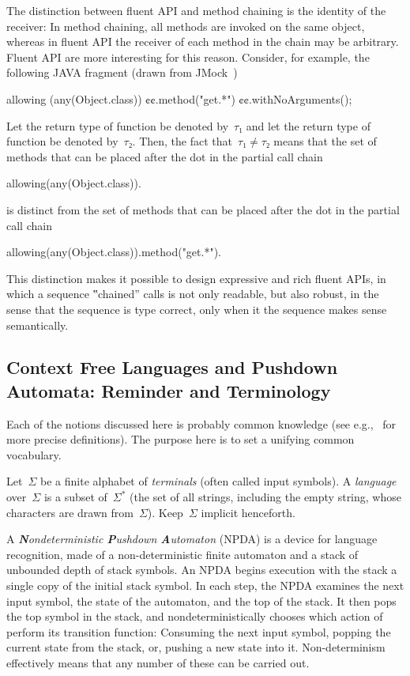 The distinction between fluent API and method chaining is the identity of the receiver:
In method chaining, all methods are invoked on the same object, whereas in fluent API
  the receiver of each method in the chain may be arbitrary.
Fluent API are more interesting for this reason.
Consider, for example, the following JAVA fragment (drawn from JMock~\cite{Freeman:Pryce:06})
\begin{JAVA}
allowing (any(Object.class))
  ¢¢.method("get.*")
  ¢¢.withNoArguments();
\end{JAVA}
Let the return type of function  be denoted by~$τ₁$ and let the
  return type of function  be denoted by~$τ₂$.
Then, the fact that~$τ₁≠τ₂$ means that the set of methods that can be placed after the dot
  in the partial call chain
\begin{JAVA}
allowing(any(Object.class)).
\end{JAVA}
is distinct from the set of methods that can be placed after the dot in the partial call chain
\begin{JAVA}
allowing(any(Object.class)).method("get.*").
\end{JAVA}
This distinction makes it possible to design expressive and rich fluent APIs, in which a
  sequence ‟chained” calls is not only readable, but also robust, in the sense that the
  sequence is type correct, only when it the sequence makes sense semantically.

\subsection{Context Free Languages and Pushdown Automata: Reminder and Terminology}
Each of the notions discussed here is probably common knowledge
 (see e.g.,~\cite{Hopcroft:book:2001,Linz:2001} for more precise definitions).
The purpose here is to set a unifying common vocabulary.

Let~$Σ$ be a finite alphabet of \emph{terminals} (often called input symbols).
A \emph{language} over~$Σ$
  is a subset of~$Σ^*$ (the set of all strings, including the empty string,
  whose characters are drawn from~$Σ$).
Keep~$Σ$ implicit henceforth.

A \emph{\textbf Nondeterministic \textbf Pushdown \textbf Automaton} (NPDA) is a device for language recognition,
  made of a non-deterministic finite automaton
  and a stack of unbounded depth of stack symbols.
An NPDA begins execution with the stack a single copy of the initial stack symbol.
In each step, the NPDA 
  examines the next input symbol,
  the state of the automaton,
  and the top of the stack.
It then pops the top symbol in the stack, and nondeterministically chooses which action of  perform 
  its transition function: 
  Consuming the next input symbol,
popping the current state from the stack,
  or, pushing a new state into it.
Non-determinism effectively means 
  that any number of these can be carried out.

